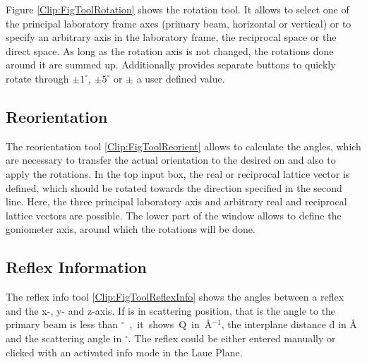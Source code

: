 Figure \ref{Clip:FigToolRotation} shows the rotation tool. It allows
to select one of the principal laboratory frame axes (primary beam,
horizontal or vertical) or to specify an arbitrary axis in the
laboratory frame, the reciprocal space or the direct space.
As long as the rotation axis is not changed, the rotations done around
it are summed up. Additionally provides separate buttons to quickly rotate through $\pm
1^\circ$, $\pm 5^\circ$ or $\pm$ a user defined value.

\subsection{Reorientation}

The reorientation tool \ref{Clip:FigToolReorient} allows to calculate the angles, which are
necessary to transfer the actual orientation to the desired on and
also to apply the rotations. In the top input box, the real or
reciprocal lattice vector is defined, which should be rotated towards
the direction specified in the second line. Here, the three principal
laboratory axis and arbitrary real and reciprocal lattice vectors are
possible. The lower part of the window allows to define the
goniometer axis, around which the rotations will be done.



\subsection{Reflex Information}

The reflex info tool \ref{Clip:FigToolReflexInfo} shows the angles
between a reflex and the x-, y- and z-axis. If is in scattering
position, that is the angle to the primary beam is less than
\unit[90]{$^\circ$}, it shows Q in \AA$^{-1}$, the interplane distance d
in \AA\, and the scattering angle in $^\circ$.
The reflex could be either entered manually or clicked with an
activated info mode in the Laue Plane.


